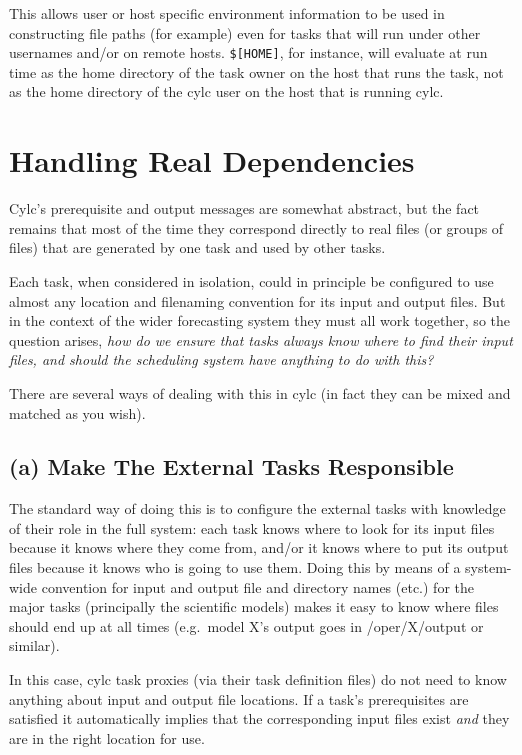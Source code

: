 \documentclass[11pt,a4paper]{article}
\begin{document}
This allows user or host specific environment information to be used in 
constructing file paths (for example) even for tasks that will run under
other usernames and/or on remote hosts. \lstinline=$[HOME]=, for instance,
will evaluate at run time as the home directory of the task owner on the
host that runs the task, not as the home directory of the cylc user on 
the host that is running cylc.

\pagebreak
\section{Handling Real Dependencies}
\label{HandlingRealDependencies}

Cylc's prerequisite and output messages are somewhat abstract, but the
fact remains that most of the time they correspond directly to real 
files (or groups of files) that are generated by one task and used by
other tasks.

Each task, when considered in isolation, could in principle be
configured to use almost any location and filenaming convention for its
input and output files. But in the context of the wider forecasting
system they must all work together, so the question arises, {\em how do
we ensure that tasks always know where to find their input files, and
should the scheduling system have anything to do with this?} 

There are several ways of dealing with this in cylc (in fact they can
be mixed and matched as you wish). 

\subsection{(a) Make The External Tasks Responsible }

The standard way of doing this is to configure the external tasks with
knowledge of their role in the full system: each task knows where to
look for its input files because it knows where they come from, and/or
it knows where to put its output files because it knows who is going to
use them. Doing this by means of a system-wide convention for input and
output file and directory names (etc.) for the major tasks (principally
the scientific models) makes it easy to know where files should end up
at all times (e.g.\ model X's output goes in /oper/X/output or similar).

In this case, cylc task proxies (via their task definition files) do not
need to know anything about input and output file locations. If a task's
prerequisites are satisfied it automatically implies that the
corresponding input files exist {\em and} they are in the right location
for use.
\end{document}
